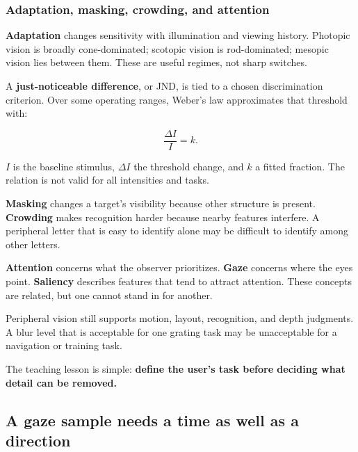 \subsubsection{Adaptation, masking, crowding, and attention}\label{04-visual-computing-ii-ch043-adaptation-masking-crowding-and-attention}

\hypertarget{04-visual-computing-ii-ch043-adaptation-masking-crowding-and-attention}{}

\textbf{Adaptation} changes sensitivity with illumination and viewing history. Photopic vision is broadly cone-dominated; scotopic vision is rod-dominated; mesopic vision lies between them. These are useful regimes, not sharp switches.

A \textbf{just-noticeable difference}, or JND, is tied to a chosen discrimination criterion. Over some operating ranges, Weber's law approximates that threshold with:

\[
\frac{\Delta I}{I}=k.
\]

\(I\) is the baseline stimulus, \(\Delta I\) the threshold change, and \(k\) a fitted fraction. The relation is not valid for all intensities and tasks.

\textbf{Masking} changes a target's visibility because other structure is present. \textbf{Crowding} makes recognition harder because nearby features interfere. A peripheral letter that is easy to identify alone may be difficult to identify among other letters.

\textbf{Attention} concerns what the observer prioritizes. \textbf{Gaze} concerns where the eyes point. \textbf{Saliency} describes features that tend to attract attention. These concepts are related, but one cannot stand in for another.

Peripheral vision still supports motion, layout, recognition, and depth judgments. A blur level that is acceptable for one grating task may be unacceptable for a navigation or training task.

The teaching lesson is simple: \textbf{define the user's task before deciding what detail can be removed.}

\subsection{A gaze sample needs a time as well as a direction}\label{04-visual-computing-ii-ch043-a-gaze-sample-needs-a-time-as-well-as-a-direction}

\hypertarget{04-visual-computing-ii-ch043-a-gaze-sample-needs-a-time-as-well-as-a-direction}{}

